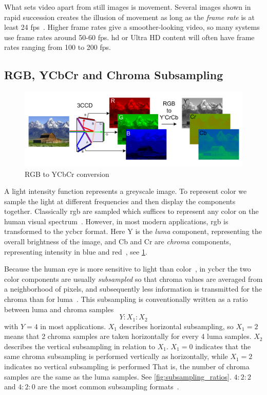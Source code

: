 What sets video apart from still images is movement. Several images shown in rapid succession creates the illusion of movement as long as the \textit{frame rate} is at least 24 \gls{fps}~\cite{Wien_Coding_Tools}. Higher frame rates give a smoother-looking video, so many systems use frame rates around 50-60 \gls{fps}. \Gls{hd} or Ultra HD content will often have frame rates ranging from 100 to 200 \gls{fps}.

\subsection{RGB, YCbCr and Chroma Subsampling}
\label{subsec:subsampling}

\begin{figure}
    \centering
    \includegraphics[scale=0.25]{pictures/wikipedia/public-domain/rgb-to-ycrcb.png}
    \caption{RGB to YCbCr conversion}
    \label{fig:rgb_to_ycbcr}
\end{figure}

A light intensity function represents a greyscale image. To represent color we sample the light at different frequencies and then display the components together. Classically \gls{rgb} are sampled which suffices to represent any color on the human visual spectrum~\cite{Flierl}. However, in most modern applications, \gls{rgb} is transformed to the \gls{ycbcr} format. Here Y is the \textit{luma} component, representing the overall brightness of the image, and Cb and Cr are \textit{chroma} components, representing intensity in blue and red~\cite{Wien_Coding_Tools}, see \cref{fig:rgb_to_ycbcr}.

Because the human eye is more sensitive to light than color~\cite{Vcodex_Introduction_to_Video_Coding,Wien_Coding_Tools}, in \gls{ycbcr} the two color components are usually \textit{subsampled} so that chroma values are averaged from a neighborhood of pixels, and subsequently less information is transmitted for the chroma than for luma~\cite{Flierl}. This subsampling is conventionally written as a ratio between luma and chroma samples $$Y:X_1:X_2$$ with $Y = 4$ in most applications. $X_1$ describes horizontal subsampling, so $X_1 = 2$ means that 2 chroma samples are taken horizontally for every 4 luma samples. $X_2$ describes the vertical subsampling in relation to $X_1$. $X_1 = 0$ indicates that the same chroma subsampling is performed vertically as horizontally, while $X_1 = 2$ indicates no vertical subsampling is performed That is, the number of chroma samples are the same as the luma samples. See \cref{fig:subsampling_ratios}. $4:2:2$ and $4:2:0$ are the most common subsampling formats~\cite{Wien_Coding_Tools}.

